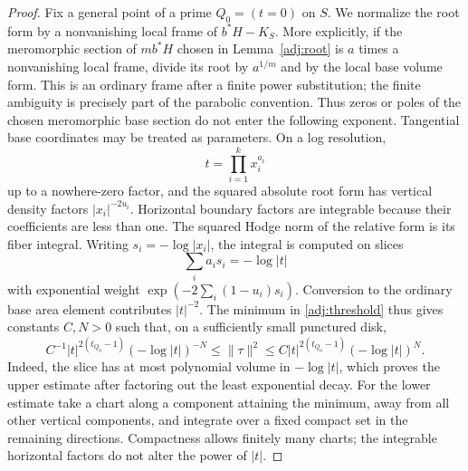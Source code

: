 \begin{proof}
Fix a general point of a prime $Q_0=(t=0)$ on $S$.  We normalize the
root form by a nonvanishing local frame of $b^*H-K_S$.  More explicitly,
if the meromorphic section of $m b^*H$ chosen in Lemma~\ref{adj:root}
is $a$ times a nonvanishing local frame, divide its root by $a^{1/m}$
and by the local base volume form.  This is an ordinary frame after a
finite power substitution; the finite ambiguity is precisely part of
the parabolic convention.  Thus zeros or poles of the chosen meromorphic
base section do not enter the following exponent.
Tangential base coordinates may be treated as parameters.  On a log resolution,
\[
                         t=\prod_{i=1}^k x_i^{a_i}
\]
up to a nowhere-zero factor, and the squared absolute root form has
vertical density factors $|x_i|^{-2u_i}$.  Horizontal boundary factors
are integrable because their coefficients are less than one.
The squared Hodge norm of the relative form is its fiber integral.
Writing $s_i=-\log|x_i|$, the integral is computed on slices
\[
                 \sum_i a_i s_i=-\log|t|
\]
with exponential weight $\exp(-2\sum_i(1-u_i)s_i)$.
Conversion to the ordinary base area element contributes $|t|^{-2}$.
The minimum in \eqref{adj:threshold} thus gives constants $C,N>0$ such
that, on a sufficiently small punctured disk,
\begin{equation}
\label{adj:norm-power}
 C^{-1}|t|^{2(t_{Q_0}-1)}(-\log|t|)^{-N}
 \leq \|\tau\|^2
 \leq C|t|^{2(t_{Q_0}-1)}(-\log|t|)^N.
\end{equation}
Indeed, the slice has at most polynomial volume in $-\log|t|$, which
proves the upper estimate after factoring out the least exponential
decay.  For the lower estimate take a chart along a component attaining
the minimum, away from all other vertical components, and integrate
over a fixed compact set in the remaining directions.  Compactness
allows finitely many charts; the integrable horizontal factors do not
alter the power of $|t|$.


\end{proof}
